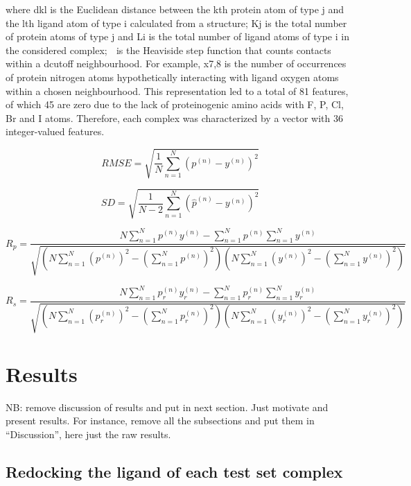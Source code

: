 \documentclass[twocolumn]{bmcart}
\begin{document}
where dkl is the Euclidean distance between the kth protein atom of type j and the lth ligand atom of type i calculated from a structure; Kj is the total number of protein atoms of type j and Li is the total number of ligand atoms of type i in the considered complex;  is the Heaviside step function that counts contacts within a dcutoff neighbourhood. For example, x7,8 is the number of occurrences of protein nitrogen atoms hypothetically interacting with ligand oxygen atoms within a chosen neighbourhood. This representation led to a total of 81 features, of which 45 are zero due to the lack of proteinogenic amino acids with F, P, Cl, Br and I atoms. Therefore, each complex was characterized by a vector with 36 integer-valued features.

\begin{equation}
RMSE = \sqrt{\frac{1}{N}\sum_{n=1}^N(p^{(n)}-y^{(n)})^2}
\label{eqn:rmse}
\end{equation}

\begin{equation}
SD = \sqrt{\frac{1}{N-2}\sum_{n=1}^N(\hat{p}^{(n)}-y^{(n)})^2}
\label{eqn:sdev}
\end{equation}

\begin{equation}
R_p = \frac{N\sum_{n=1}^Np^{(n)}y^{(n)}-\sum_{n=1}^Np^{(n)}\sum_{n=1}^Ny^{(n)}}{\sqrt{(N\sum_{n=1}^N(p^{(n)})^2-(\sum_{n=1}^Np^{(n)})^2)(N\sum_{n=1}^N(y^{(n)})^2-(\sum_{n=1}^Ny^{(n)})^2)}}
\label{eqn:pcor}
\end{equation}

\begin{equation}
R_s = \frac{N\sum_{n=1}^Np_r^{(n)}y_r^{(n)}-\sum_{n=1}^Np_r^{(n)}\sum_{n=1}^Ny_r^{(n)}}{\sqrt{(N\sum_{n=1}^N(p_r^{(n)})^2-(\sum_{n=1}^Np_r^{(n)})^2)(N\sum_{n=1}^N(y_r^{(n)})^2-(\sum_{n=1}^Ny_r^{(n)})^2)}}
\label{eqn:scor}
\end{equation}

\section*{Results}

NB: remove discussion of results and put in next section. Just motivate and present results. For instance, remove all the subsections and put them in “Discussion”, here just the raw results. 

\subsection*{Redocking the ligand of each test set complex}
\end{document}
